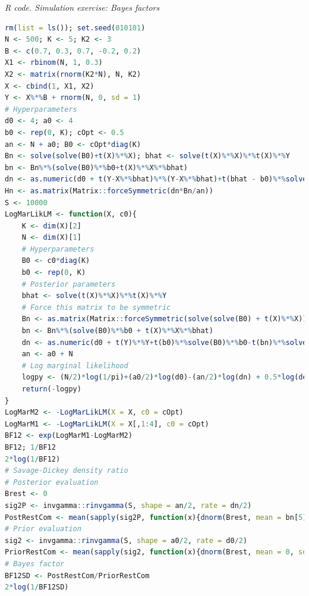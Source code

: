 \begin{tcolorbox}[enhanced,width=4.67in,center upper,
	fontupper=\large\bfseries,drop shadow southwest,sharp corners]
	\textit{R code. Simulation exercise: Bayes factors}
	\begin{VF}
		\begin{lstlisting}[language=R]
rm(list = ls()); set.seed(010101)
N <- 500; K <- 5; K2 <- 3 
B <- c(0.7, 0.3, 0.7, -0.2, 0.2) 
X1 <- rbinom(N, 1, 0.3)
X2 <- matrix(rnorm(K2*N), N, K2)
X <- cbind(1, X1, X2)
Y <- X%*%B + rnorm(N, 0, sd = 1)
# Hyperparameters
d0 <- 4; a0 <- 4
b0 <- rep(0, K); cOpt <- 0.5
an <- N + a0; B0 <- cOpt*diag(K)
Bn <- solve(solve(B0)+t(X)%*%X); bhat <- solve(t(X)%*%X)%*%t(X)%*%Y
bn <- Bn%*%(solve(B0)%*%b0+t(X)%*%X%*%bhat)
dn <- as.numeric(d0 + t(Y-X%*%bhat)%*%(Y-X%*%bhat)+t(bhat - b0)%*%solve(solve(t(X)%*%X)+B0)%*%(bhat - b0))
Hn <- as.matrix(Matrix::forceSymmetric(dn*Bn/an))
S <- 10000
LogMarLikLM <- function(X, c0){
	K <- dim(X)[2]
	N <- dim(X)[1]	
	# Hyperparameters
	B0 <- c0*diag(K)
	b0 <- rep(0, K)
	# Posterior parameters
	bhat <- solve(t(X)%*%X)%*%t(X)%*%Y
	# Force this matrix to be symmetric
	Bn <- as.matrix(Matrix::forceSymmetric(solve(solve(B0) + t(X)%*%X))) 
	bn <- Bn%*%(solve(B0)%*%b0 + t(X)%*%X%*%bhat)
	dn <- as.numeric(d0 + t(Y)%*%Y+t(b0)%*%solve(B0)%*%b0-t(bn)%*%solve(Bn)%*%bn)
	an <- a0 + N
	# Log marginal likelihood
	logpy <- (N/2)*log(1/pi)+(a0/2)*log(d0)-(an/2)*log(dn) + 0.5*log(det(Bn)/det(B0)) + lgamma(an/2)-lgamma(a0/2)
	return(-logpy)
}
LogMarM2 <- -LogMarLikLM(X = X, c0 = cOpt)
LogMarM1 <- -LogMarLikLM(X = X[,1:4], c0 = cOpt)
BF12 <- exp(LogMarM1-LogMarM2) 
BF12; 1/BF12
2*log(1/BF12)
# Savage-Dickey density ratio
# Posterior evaluation
Brest <- 0
sig2P <- invgamma::rinvgamma(S, shape = an/2, rate = dn/2)
PostRestCom <- mean(sapply(sig2P, function(x){dnorm(Brest, mean = bn[5], sd = (x*Bn[5,5])^0.5, log = FALSE)})) 
# Prior evaluation
sig2 <- invgamma::rinvgamma(S, shape = a0/2, rate = d0/2)
PriorRestCom <- mean(sapply(sig2, function(x){dnorm(Brest, mean = 0, sd = (x*cOpt)^0.5, log = FALSE)})) 
# Bayes factor
BF12SD <- PostRestCom/PriorRestCom
2*log(1/BF12SD)
\end{lstlisting}
	\end{VF}
\end{tcolorbox}            


